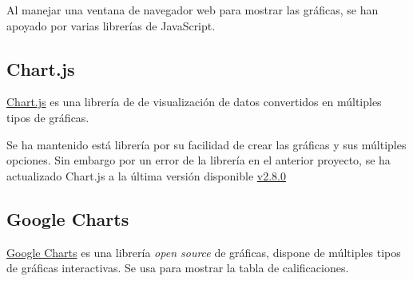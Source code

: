 Al manejar una ventana de navegador web para mostrar las gráficas, se han apoyado por varias librerías de JavaScript.

\subsection{Chart.js}
\href{https://www.chartjs.org/}{Chart.js} es una librería de de visualización de datos convertidos en múltiples tipos de gráficas.

Se ha mantenido está librería por su facilidad de crear las gráficas y sus múltiples opciones. Sin embargo por un error de la librería en el anterior proyecto, se ha actualizado Chart.js a la última versión disponible \href{https://www.chartjs.org/dist/2.8.0/Chart.min.js}{v2.8.0}

\subsection{Google Charts}

\href{https://developers.google.com/chart/}{Google Charts} es una librería \textit{open source} de gráficas, dispone de múltiples tipos de gráficas interactivas. Se usa para mostrar la tabla de calificaciones.



